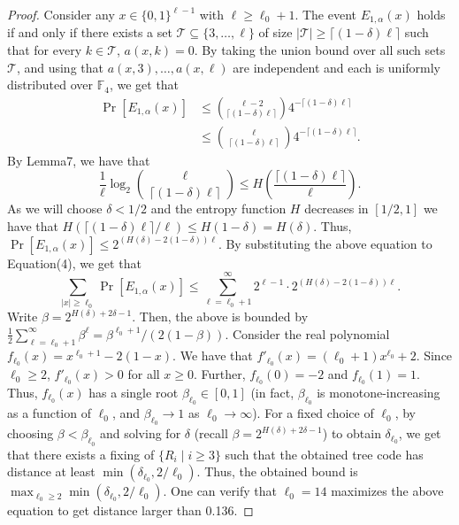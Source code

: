 \documentclass[10pt,a4paper]{article}
\begin{document}
\begin{proof}
Consider any $x\in\{0,1\}^{\ell-1}$ with $\ell\ge\ell_0+1$. The event $E_{1,\alpha}(x)$ holds if and only if there exists a set $\mathcal T\subseteq\{3,\ldots,\ell\}$ of size $|\mathcal T|\ge\lceil(1-\delta)\ell\rceil$ such that for every $k\in\mathcal T$, $a(x,k)=0$. By taking the union bound over all such sets $\mathcal T$, and using that $a(x,3),\ldots,a(x,\ell)$ are independent and each is uniformly distributed over $\mathbb F_4$, we get that
\begin{align*}
\Pr[E_{1,\alpha}(x)]
&\le\binom{\ell-2}{\lceil(1-\delta)\ell\rceil}4^{-\lceil(1-\delta)\ell\rceil}\\
&\le\binom\ell{\lceil(1-\delta)\ell\rceil}4^{-\lceil(1-\delta)\ell\rceil}.
\end{align*}
By Lemma7, we have that
\[
\frac1\ell\log_2\binom\ell{\lceil(1-\delta)\ell\rceil}
\le H\left(\frac{\lceil(1-\delta)\ell\rceil}{\ell}\right).
\]
As we will choose $\delta<1/2$ and the entropy function $H$ decreases in $[1/2,1]$ we have that $H(\lceil(1-\delta)\ell\rceil/\ell)\le H(1-\delta)=H(\delta)$.
Thus, $\Pr[E_{1,\alpha}(x)]\le2^{(H(\delta)-2(1-\delta))\ell}$. By substituting the above equation to Equation(4), we get that
\[
\sum_{|x|\ge\ell_0}\Pr[E_{1,\alpha}(x)]
\le\sum_{\ell=\ell_0+1}^\infty2^{\ell-1}\cdot2^{(H(\delta)-2(1-\delta))\ell}.
\]
Write $\beta=2^{H(\delta)+2\delta-1}$. Then, the above is bounded by $\frac12\sum_{\ell=\ell_0+1}^\infty\beta^\ell=\beta^{\ell_0+1}/(2(1-\beta))$.
Consider the real polynomial $f_{\ell_0}(x)=x^{\ell_0+1}-2(1-x)$. We have that $f'_{\ell_0}(x)=(\ell_0+1)x^{\ell_0}+2$.
Since $\ell_0\ge2$, $f'_{\ell_0}(x)>0$ for all $x\ge0$. Further, $f_{\ell_0}(0)=-2$ and $f_{\ell_0}(1)=1$. Thus, $f_{\ell_0}(x)$ has a single root $\beta_{\ell_0}\in[0,1]$ (in fact, $\beta_{\ell_0}$ is monotone-increasing as a function of $\ell_0$, and $\beta_{\ell_0}\to1$ as $\ell_0\to\infty$). For a fixed choice of $\ell_0$, by choosing $\beta<\beta_{\ell_0}$ and solving for $\delta$ (recall $\beta=2^{H(\delta)+2\delta-1}$) to obtain $\delta_{\ell_0}$, we get that there exists a fixing of $\{R_i\mid i\ge3\}$ such that the obtained tree code has distance at least $\min(\delta_{\ell_0},2/\ell_0)$. Thus, the obtained bound is $\max_{\ell_0\ge2}\min(\delta_{\ell_0},2/\ell_0)$.
One can verify that $\ell_0=14$ maximizes the above equation to get distance larger than 0.136.
\end{proof}
\end{document}

